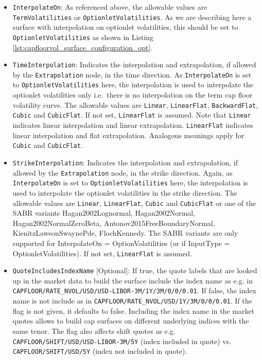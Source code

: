 \begin{itemize}
\item \lstinline!InterpolateOn!:
As referenced above, the allowable values are \lstinline!TermVolatilities! or \lstinline!OptionletVolatilities!. As we are describing here a surface with interpolation on optionlet volatilities, this should be set to \lstinline!OptionletVolatilities! as shown in Listing \ref{lst:capfloorvol_surface_configuration_opt}.

\item \lstinline!TimeInterpolation!:
Indicates the interpolation and extrapolation, if allowed by the \lstinline!Extrapolation! node, in the time
direction. As \lstinline!InterpolateOn! is set to \lstinline!OptionletVolatilities! here, the interpolation is used to
interpolate the optionlet volatilities only i.e.\ there is no interpolation on the term cap floor volatility curve. The
allowable values are \lstinline!Linear!, \lstinline!LinearFlat!, \lstinline!BackwardFlat!, \lstinline!Cubic!
and \lstinline!CubicFlat!. If not set, \lstinline!LinearFlat! is assumed. Note that \lstinline!Linear! indicates linear
interpolation and linear extrapolation. \lstinline!LinearFlat! indicates linear interpolation and flat
extrapolation. Analogous meanings apply for \lstinline!Cubic! and \lstinline!CubicFlat!.

\item \lstinline!StrikeInterpolation!:
Indicates the interpolation and extrapolation, if allowed by the \lstinline!Extrapolation! node, in the strike direction. Again, as \lstinline!InterpolateOn! is set to \lstinline!OptionletVolatilities! here, the interpolation is used to interpolate the optionlet volatilities in the strike direction. The allowable values are \lstinline!Linear!, \lstinline!LinearFlat!, \lstinline!Cubic! and \lstinline!CubicFlat! or one of the SABR variants Hagan2002Lognormal, Hagan2002Normal, Hagan2002NormalZeroBeta, Antonov2015FreeBoundaryNormal, KienitzLawsonSwaynePde, FlochKennedy. The SABR variants are only supported for InterpolateOn = OptionVolatilities (or if InputType = OptionletVolatilities). If not set, \lstinline!LinearFlat! is assumed.

\item \lstinline!QuoteIncludesIndexName! [Optional]:
If true, the quote labels that are looked up in the market data to build the surface include the index name as e.g. in \lstinline!CAPFLOOR/RATE_NVOL/USD/USD-LIBOR-3M/1Y/3M/0/0/0.01!. If false, the index name is not include as in \lstinline!CAPFLOOR/RATE_NVOL/USD/1Y/3M/0/0/0.01!. If the flag is not given, it defaults to false. Including the index name in the market quotes allows to build cap surfaces on different underlying indices with the same tenor. The flag also affects shift quotes as e.g. \lstinline!CAPFLOOR/SHIFT/USD/USD-LIBOR-3M/5Y! (index included in quote) vs. \lstinline!CAPFLOOR/SHIFT/USD/5Y! (index not included in quote).


\end{itemize}
